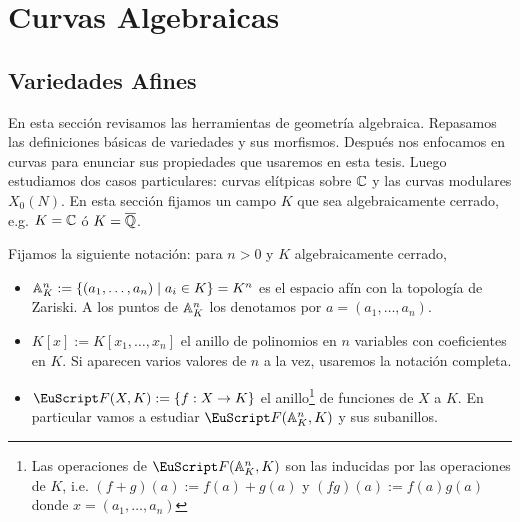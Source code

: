 \documentclass[../../tesis_maestria]{subfiles}
\begin{document}
\section{Curvas Algebraicas}

\subsection{Variedades Afines}
En esta sección revisamos las herramientas de geometría algebraica. Repasamos las definiciones básicas de variedades y sus morfismos. Después nos enfocamos en curvas para enunciar sus propiedades que usaremos en esta tesis. Luego estudiamos dos casos particulares: curvas elítpicas sobre $\mathbb{C}$ y las curvas modulares $X_0(N)$. En esta sección fijamos un campo $K$ que sea algebraicamente cerrado, e.g. $K=\mathbb{C}$ ó $K=\overline{\mathbb{Q}}$.

Fijamos la siguiente notación: para $n>0$ y $K$ algebraicamente cerrado,
\begin{itemize}
	\item $\mathbb{A}^n_K:=\{(a_1,\ldots,a_n)\mid a_i\in K\}=K^n$ es el espacio afín con la topología de Zariski. A los puntos de $\mathbb{A}^n_K$ los denotamos por $a=(a_1,\ldots,a_n)$.
	\item $K[x]:=K[x_1,\ldots,x_n]$ el anillo de polinomios en $n$ variables con coeficientes en $K$. Si aparecen varios valores de $n$ a la vez, usaremos la notación completa.
	\item $\Ff(X,K):=\{f:X\ra K\}$ el anillo\footnote{Las operaciones de $\Ff(\AAA^n_K,K)$ son las inducidas por las operaciones de $K$, i.e. $(f+g)(a):=f(a)+g(a)$ y $(fg)(a):=f(a)g(a)$ donde $x=(a_1,\ldots,a_n)$} de funciones de $X$ a $K$. En particular vamos a estudiar $\Ff(\AAA^n_K,K)$ y sus subanillos.
\end{itemize}
\end{document}
